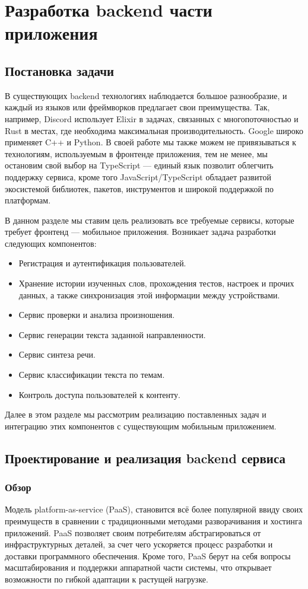 \section{Разработка backend части приложения}

\subsection{Постановка задачи}
В существующих backend технологиях наблюдается большое разнообразие, и каждый из языков или фреймворков предлагает свои преимущества. Так, например, Discord использует Elixir в задачах, связанных с многопоточностью\cite{discord-elixir} и Rust в местах, где необходима максимальная производительность\cite{discord-rust}. Google широко применяет C++ и Python. В своей работе мы также можем не привязываться к технологиям, используемым в фронтенде приложения, тем не менее, мы остановим свой выбор на TypeScript --- единый язык позволит облегчить поддержку сервиса, кроме того JavaScript/TypeScript обладает развитой экосистемой библиотек, пакетов, инструментов и широкой поддержкой по платформам.

В данном разделе мы ставим цель реализовать все требуемые сервисы, которые требует фронтенд --- мобильное приложения. Возникает задача разработки следующих компонентов:
\begin{itemize}
	\item Регистрация и аутентификация пользователей.
	\item Хранение истории изученных слов, прохождения тестов, настроек и прочих данных, а также синхронизация этой информации между устройствами.
	\item Сервис проверки и анализа произношения.
	\item Сервис генерации текста заданной направленности.
	\item Сервис синтеза речи.
	\item Сервис классификации текста по темам.
	\item Контроль доступа пользователей к контенту.
\end{itemize}

Далее в этом разделе мы рассмотрим реализацию поставленных задач и интеграцию этих компонентов с существующим мобильным приложением.

\subsection{Проектирование и реализация backend сервиса}
\subsubsection{Обзор}
Модель platform-as-service (PaaS), становится всё более популярной ввиду своих преимуществ в сравнении с традиционными методами разворачивания и хостинга приложений. PaaS позволяет своим потребителям абстрагироваться от инфраструктурных деталей, за счет чего ускоряется процесс разработки и доставки программного обеспечения. Кроме того, PaaS берут на себя вопросы масштабирования и поддержки аппаратной части системы, что открывает возможности по гибкой адаптации к растущей нагрузке.

